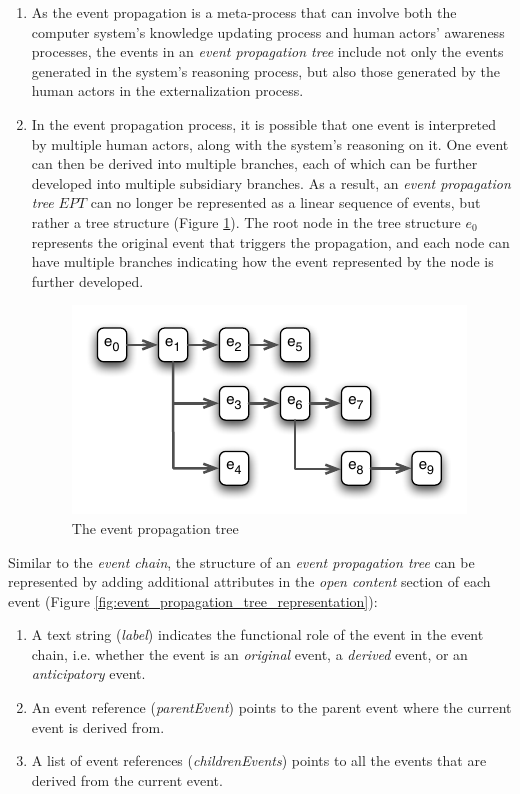 \begin{enumerate}
	\item As the event propagation is a meta-process that can involve both the computer system's knowledge updating process and human actors' awareness processes, the events in an \emph{event propagation tree} include not only the events generated in the system's reasoning process, but also those generated by the human actors in the externalization process.
	\item In the event propagation process, it is possible that one event is interpreted by multiple human actors, along with the system's reasoning on it. One event can then be derived into multiple branches, each of which can be further developed into multiple subsidiary branches. As a result, an \emph{event propagation tree} $EPT$ can no longer be represented as a linear sequence of events, but rather a tree structure (Figure \ref{fig:event_propagation_tree}). The root node in the tree structure $e_0$ represents the original event that triggers the propagation, and each node can have multiple branches indicating how the event represented by the node is further developed.
	\begin{figure}[htbp] %
		\centering
		\includegraphics{event_propagation_tree.pdf} 
		\caption{The event propagation tree}
		\label{fig:event_propagation_tree}
	\end{figure}
\end{enumerate}

Similar to the \emph{event chain}, the structure of an \emph{event propagation tree} can be represented by adding additional attributes in the \emph{open content} section of each event (Figure \ref{fig:event_propagation_tree_representation}): 
\begin{enumerate}
 	\item A text string (\emph{label}) indicates the functional role of the event in the event chain, i.e. whether the event is an \emph{original} event, a \emph{derived} event, or an \emph{anticipatory} event.
 	\item An event reference (\emph{parentEvent}) points to the parent event where the current event is derived from. 
 	\item A list of event references (\emph{childrenEvents}) points to all the events that are derived from the current event.
 \end{enumerate} 

